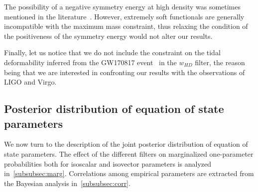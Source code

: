 
The possibility of a negative symmetry energy at high density was sometimes 
mentioned in the literature~\cite{Li2017,Wiringa1988}. 
However, extremely soft functionals are generally incompatible with the maximum 
mass constraint, thus relaxing the condition of the positiveness of the 
symmetry energy would not alter our results.

Finally, let us notice that we do not include the constraint on the tidal
deformability inferred from the GW170817 event~\cite{GWtidal} in the $w_{HD}$ 
filter, the reason being that we are interested in confronting our results with 
the observations of LIGO and Virgo.

\subsection{Posterior distribution of equation of state 
parameters}\label{subsec:posterior}

We now turn to the description of the joint posterior distribution of equation 
of state parameters. The effect of the different filters on 
marginalized one-parameter probabilities both for isoscalar and isovector 
parameters is analyzed in~\ref{subsubsec:marg}. Correlations among empirical 
parameters are extracted from the Bayesian analysis in~\ref{subsubsec:corr}.

